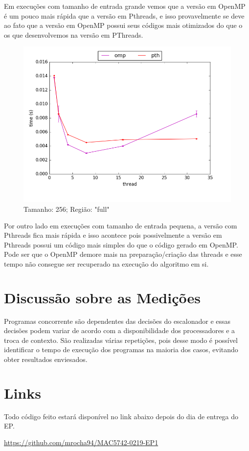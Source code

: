 \documentclass[final,12pt,a4paper]{elsarticle}
\begin{document}
Em execuções com tamanho de entrada grande vemos que a versão em OpenMP é um pouco mais rápida que a versão em Pthreads, e isso provavelmente se deve ao fato que a versão em OpenMP possui seus códigos mais otimizados do que o os que desenvolvemos na versão em PThreads.

\clearpage
\begin{figure}[htpb]
    \centering
    \includegraphics[width=.9\textwidth]{image10}
    \caption{Tamanho: 256; Região: "full"}
    \label{fig:image10}
\end{figure}

Por outro lado em execuções com tamanho de entrada pequena, a versão com Pthreads fica mais rápida e isso acontece pois possivelmente a versão em Pthreads possui um código mais simples do que o código gerado em OpenMP. Pode ser que o OpenMP demore mais na preparação/criação das threads e esse tempo não consegue ser recuperado na execução do algoritmo em si.

\section{Discussão sobre as Medições}

Programas concorrente são dependentes das decisões do escalonador e essas decisões podem variar de acordo com a disponibilidade dos processadores e a troca de contexto. São realizadas várias repetições, pois desse modo é possível identificar o tempo de execução dos programas na maioria dos casos, evitando obter resultados enviesados.

\section{Links}

Todo código feito estará disponível no link abaixo depois do dia de entrega do EP.

\url{https://github.com/mrocha94/MAC5742-0219-EP1}
\end{document}
